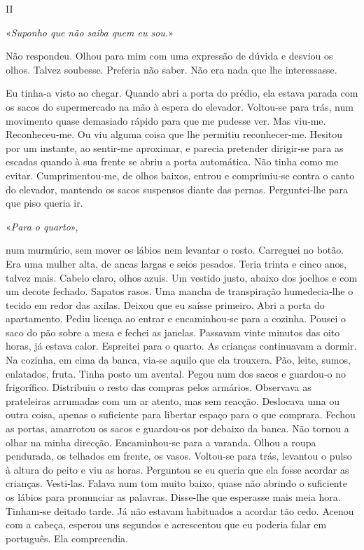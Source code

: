 II

«\emph{Suponho que não saiba quem eu sou.}»

Não respondeu. Olhou para mim com uma expressão de dúvida e desviou os
olhos. Talvez soubesse. Preferia não saber. Não era nada que lhe
interessasse.

Eu tinha­‑a visto ao chegar. Quando abri a porta do prédio, ela estava
parada com os sacos do supermercado na mão à espera do elevador.
Voltou­‑se para trás, num movimento quase demasiado rápido para que me
pudesse ver. Mas viu­‑me. Reconheceu­‑me. Ou viu alguma coisa que lhe
permitiu reconhecer­‑me. Hesitou por um instante, ao sentir­‑me
aproximar, e parecia pretender dirigir­‑se para as escadas quando à sua
frente se abriu a porta automática. Não tinha como me evitar.
Cumprimentou­‑me, de olhos baixos, entrou e comprimiu­‑se contra o canto
do elevador, mantendo os sacos suspensos diante das pernas.
Perguntei­‑lhe para que piso queria ir.

«\emph{Para o quarto}»,

num murmúrio, sem mover os lábios nem levantar o rosto. Carreguei no
botão. Era uma mulher alta, de ancas largas e seios pesados. Teria
trinta e cinco anos, talvez mais. Cabelo claro, olhos azuis. Um vestido
justo, abaixo dos joelhos e com um decote fechado. Sapatos rasos. Uma
mancha de transpiração humedecia­‑lhe o tecido em redor das axilas.
Deixou que eu saísse primeiro. Abri a porta do apartamento. Pediu
licença ao entrar e encaminhou­‑se para a cozinha. Pousei o saco do pão
sobre a mesa e fechei as janelas. Passavam vinte minutos das oito horas,
já estava calor. Espreitei para o quarto. As crianças continuavam a
dormir. Na cozinha, em cima da banca, via­‑se aquilo que ela trouxera.
Pão, leite, sumos, enlatados, fruta. Tinha posto um avental. Pegou num
dos sacos e guardou­‑o no frigorífico. Distribuiu o resto das compras
pelos armários. Observava as prateleiras arrumadas com um ar atento, mas
sem reacção. Deslocava uma ou outra coisa, apenas o suficiente para
libertar espaço para o que comprara. Fechou as portas, amarrotou os
sacos e guardou­‑os por debaixo da banca. Não tornou a olhar na minha
direcção. Encaminhou­‑se para a varanda. Olhou a roupa pendurada, os
telhados em frente, os vasos. Voltou­‑se para trás, levantou o pulso à
altura do peito e viu as horas. Perguntou se eu queria que ela fosse
acordar as crianças. Vesti­‑las. Falava num tom muito baixo, quase não
abrindo o suficiente os lábios para pronunciar as palavras. Disse­‑lhe
que esperasse mais meia hora. Tinham­‑se deitado tarde. Já não estavam
habituados a acordar tão cedo. Acenou com a cabeça, esperou uns segundos
e acrescentou que eu poderia falar em português. Ela compreendia.

